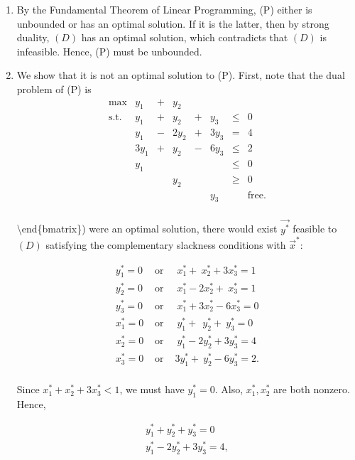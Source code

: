 \begin{enumerate}
\def\labelenumi{\arabic{enumi}.}
\item
  By the Fundamental Theorem of Linear Programming, (P) either is
  unbounded or has an optimal solution. If it is the latter, then by
  strong duality, \((D)\) has an optimal solution, which contradicts
  that \((D)\) is infeasible. Hence, (P) must be unbounded.
\item
  We show that it is not an optimal solution to (P). First, note that
  the dual problem of (P) is \[\begin{array}{rrcrcrlll}
  \max & y_1 & +& y_2  &   &       \\
  \mbox{s.t.} 
  &  y_1 & + &  y_2 & + &  y_3 & \leq & 0  \\
  &  y_1 & - & 2y_2 & + & 3y_3  & = & 4  \\
  & 3y_1 & + &  y_2 & - & 6y_3  & \leq & 2  \\
  &  y_1 &   &     &    &      & \leq & 0 \\
  &      &   & y_2  &   &      & \geq   &  0 \\
  &      &   &     &    & y_3  &    & \mbox{free.} \\
  \end{array}\]

  \textbackslash{}end\{bmatrix\}) were an optimal solution, there would
  exist \(\vec{y^*}\) feasible to \((D)\) satisfying the complementary
  slackness conditions with \(\vec{x}^*\):

  \begin{eqnarray*}
   y_1^* = 0 & \mbox{ or } &  ~x_1^* + ~x_2^* + 3x_3^* = 1 \\
   y_2^* = 0 & \mbox{ or } &  ~x_1^* - 2x_2^* +~x_3^* = 1 \\
   y_3^* = 0 & \mbox{ or } &  ~x_1^* + 3x_2^* - 6x_3^* = 0 \\
   x_1^* = 0 & \mbox{ or } &  ~y_1^* + ~~y_2^* + ~y_3^* = 0 \\
   x_2^* = 0 & \mbox{ or } &  ~y_1^*  - 2y_2^* + 3y_3^* =  4 \\
   x_3^* = 0 & \mbox{ or } &  3y_1^*  + ~y_2^* - 6y_3^* =  2. \\
  \end{eqnarray*}

  Since \(x^*_1 + x_2^* + 3x_3^* \lt 1\), we must have \(y_1^* = 0\).
  Also, \(x_1^*, x_2^*\) are both nonzero. Hence,

  \begin{eqnarray*}
  y_1^* + y_2^* + y_3^* = 0~ \\
  y_1^* - 2y_2^* + 3y_3^* = 4,
  \end{eqnarray*}


\end{enumerate}
